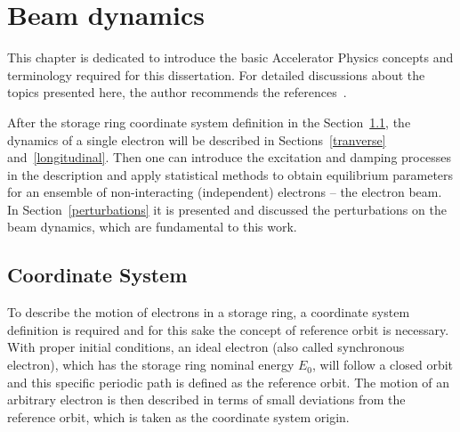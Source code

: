 \chapter{Beam dynamics}
This chapter is dedicated to introduce the basic Accelerator Physics concepts and terminology required for this dissertation. For detailed discussions about the topics presented here, the author recommends the references~\cite{sands1970physics, wiedemann2007physics}.

After the storage ring coordinate system definition in the Section~\ref{coord}, the dynamics of a single electron will be described in Sections~\ref{tranverse} and~\ref{longitudinal}. Then one can introduce the excitation and damping processes in the description and apply statistical methods to obtain equilibrium parameters for an ensemble of non-interacting (independent) electrons -- the electron beam. In Section~\ref{perturbations} it is presented and discussed the perturbations on the beam dynamics, which are fundamental to this work.
\section{Coordinate System}\label{coord}
To describe the motion of electrons in a storage ring, a coordinate system definition is required and for this sake the concept of reference orbit is necessary. With proper initial conditions, an ideal electron (also called synchronous electron), which has the storage ring nominal energy $E_0$, will follow a closed orbit and this specific periodic path is defined as the reference orbit. The motion of an arbitrary electron is then described in terms of small deviations from the reference orbit, which is taken as the coordinate system origin. 


